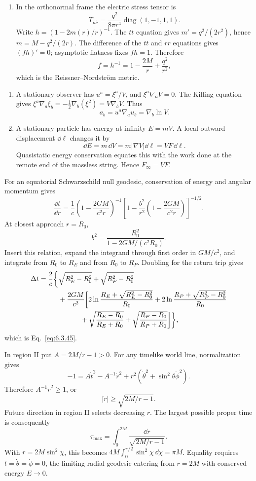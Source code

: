 \begin{enumerate}[leftmargin=2.8em,itemsep=1.2em]
\begin{enumerate}[label=\alph*),leftmargin=2em]
\item In the orthonormal frame the electric stress tensor is
\[
 T_{\hat\mu\hat\nu}=\frac{q^2}{8\pi r^4}
 \operatorname{diag}(1,-1,1,1).
\]
Write \(h=(1-2m(r)/r)^{-1}\).  The \(tt\) equation gives
\(m'=q^2/(2r^2)\), hence
\(m=M-q^2/(2r)\).  The difference of the \(tt\) and \(rr\) equations gives
\((fh)'=0\); asymptotic flatness fixes \(fh=1\).  Therefore
\[
 f=h^{-1}=1-\frac{2M}{r}+\frac{q^2}{r^2},
\]
which is the Reissner--Nordstr\"om metric.
\end{enumerate}

\begin{enumerate}[label=\alph*),leftmargin=2em]
\item A stationary observer has \(u^a=\xi^a/V\), and
\(\xi^a\nabla_aV=0\).  The Killing equation gives
\(\xi^a\nabla_a\xi_b=-\tfrac12\nabla_b(\xi^2)=V\nabla_bV\).
Thus
\[
 a_b=u^a\nabla_au_b=\nabla_b\ln V.
\]

\item A stationary particle has energy at infinity \(E=mV\).  A local
outward displacement \(\dd\ell\) changes it by
\[
 \dd E=m\,\dd V=m|\nabla V|\dd\ell=VF\,\dd\ell.
\]
Quasistatic energy conservation equates this with the work done at the remote
end of the massless string.  Hence \(F_\infty=VF\).
\end{enumerate}

For an equatorial Schwarzschild null geodesic, conservation of energy and
angular momentum gives
\[
 \frac{\dd t}{\dd r}
 =\frac1c\left(1-\frac{2GM}{c^2r}\right)^{-1}
 \left[1-\frac{b^2}{r^2}
 \left(1-\frac{2GM}{c^2r}\right)\right]^{-1/2}.
\]
At closest approach \(r=R_0\),
\[
 b^2=\frac{R_0^2}{1-2GM/(c^2R_0)}.
\]
Insert this relation, expand the integrand through first order in \(GM/c^2\),
and integrate from \(R_0\) to \(R_E\) and from \(R_0\) to \(R_P\).  Doubling
for the return trip gives
\[
\begin{aligned}
\Delta t=\frac{2}{c}\biggl\{&\sqrt{R_E^2-R_0^2}+\sqrt{R_P^2-R_0^2}\\
&+\frac{2GM}{c^2}\biggl[
2\ln\frac{R_E+\sqrt{R_E^2-R_0^2}}{R_0}
+2\ln\frac{R_P+\sqrt{R_P^2-R_0^2}}{R_0}\\
&\hspace{3.2em}+\sqrt{\frac{R_E-R_0}{R_E+R_0}}
+\sqrt{\frac{R_P-R_0}{R_P+R_0}}
\biggr]\biggr\},
\end{aligned}
\]
which is Eq.~\eqref{eq:6.3.45}.

In region II put \(A=2M/r-1>0\).  For any timelike world line,
normalization gives
\[
 -1=A\dot t^2-A^{-1}\dot r^2
 +r^2(\dot\theta^2+\sin^2\theta\dot\phi^2).
\]
Therefore \(A^{-1}\dot r^2\ge1\), or
\[
 |\dot r|\ge\sqrt{2M/r-1}.
\]
Future direction in region II selects decreasing \(r\).  The largest possible
proper time is consequently
\[
 \tau_{\max}=\int_0^{2M}\frac{\dd r}{\sqrt{2M/r-1}}.
\]
With \(r=2M\sin^2\chi\), this becomes
\(4M\int_0^{\pi/2}\sin^2\chi\,\dd\chi=\pi M\).
Equality requires \(\dot t=\dot\theta=\dot\phi=0\), the limiting radial
geodesic entering from \(r=2M\) with conserved energy \(E\to0\).
\end{enumerate}
